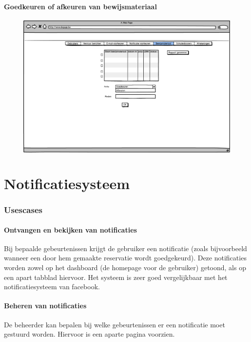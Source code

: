\documentclass[11pt,a4paper,oneside]{article}
\begin{document}
\subsection{Goedkeuren of afkeuren van bewijsmateriaal}
\begin{figure}[H]\includegraphics[width=\textwidth]{../../mockups/admin_verifierenbewijsmateriaal.png}\end{figure}

\setcounter{section}{0}
\setcounter{subsection}{0}
\part{Notificatiesysteem}
\section{Usescases}
\subsection{Ontvangen en bekijken van notificaties}
Bij bepaalde gebeurtenissen krijgt de gebruiker een notificatie (zoals bijvoorbeeld wanneer een door hem gemaakte reservatie wordt goedgekeurd).
Deze notificaties worden zowel op het dashboard (de homepage voor de gebruiker) getoond, als op een apart tabblad hiervoor. Het systeem is zeer goed
vergelijkbaar met het notificatiesysteem van facebook.

\subsection{Beheren van notificaties}
De beheerder kan bepalen bij welke gebeurtenissen er een notificatie moet gestuurd worden. Hiervoor is een aparte pagina voorzien.
\end{document}
